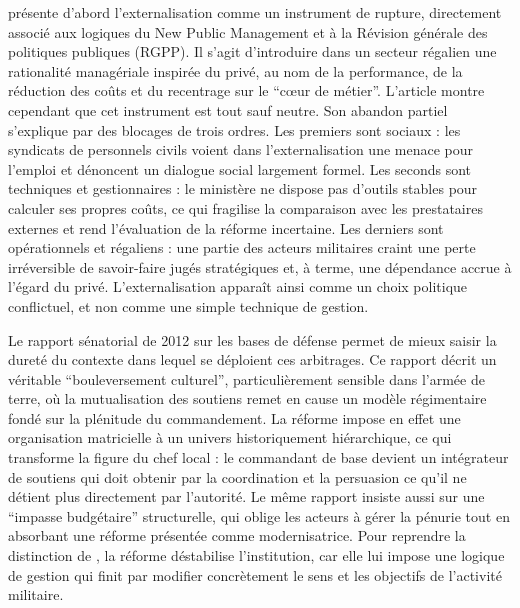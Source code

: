 \documentclass[12pt,a4paper]{article}
\begin{document}
\textcite{Larrieu2018NPMSoutiensArmees} pr\'esente d'abord l'externalisation comme un instrument de rupture, directement associ\'e aux logiques du New Public Management et \`a la R\'evision g\'en\'erale des politiques publiques (RGPP). Il s'agit d'introduire dans un secteur r\'egalien une rationalit\'e manag\'eriale inspir\'ee du priv\'e, au nom de la performance, de la r\'eduction des co\^uts et du recentrage sur le ``c\oe ur de m\'etier''. L'article montre cependant que cet instrument est tout sauf neutre. Son abandon partiel s'explique par des blocages de trois ordres. Les premiers sont sociaux : les syndicats de personnels civils voient dans l'externalisation une menace pour l'emploi et d\'enoncent un dialogue social largement formel. Les seconds sont techniques et gestionnaires : le minist\`ere ne dispose pas d'outils stables pour calculer ses propres co\^uts, ce qui fragilise la comparaison avec les prestataires externes et rend l'\'evaluation de la r\'eforme incertaine. Les derniers sont op\'erationnels et r\'egaliens : une partie des acteurs militaires craint une perte irr\'eversible de savoir-faire jug\'es strat\'egiques et, \`a terme, une d\'ependance accrue \`a l'\'egard du priv\'e. L'externalisation appara\^it ainsi comme un choix politique conflictuel, et non comme une simple technique de gestion.

Le rapport s\'enatorial de 2012 sur les bases de d\'efense \parencite{RogerDulait2012BasesDefense} permet de mieux saisir la duret\'e du contexte dans lequel se d\'eploient ces arbitrages. Ce rapport d\'ecrit un v\'eritable ``bouleversement culturel'', particuli\`erement sensible dans l'arm\'ee de terre, o\`u la mutualisation des soutiens remet en cause un mod\`ele r\'egimentaire fond\'e sur la pl\'enitude du commandement. La r\'eforme impose en effet une organisation matricielle \`a un univers historiquement hi\'erarchique, ce qui transforme la figure du chef local : le commandant de base devient un int\'egrateur de soutiens qui doit obtenir par la coordination et la persuasion ce qu'il ne d\'etient plus directement par l'autorit\'e. Le m\^eme rapport insiste aussi sur une ``impasse budg\'etaire'' structurelle, qui oblige les acteurs \`a g\'erer la p\'enurie tout en absorbant une r\'eforme pr\'esent\'ee comme modernisatrice. Pour reprendre la distinction de \textcite{Jakubowski2011InstitutionMilitaire}, la r\'eforme d\'estabilise l'institution, car elle lui impose une logique de gestion qui finit par modifier concr\`etement le sens et les objectifs de l'activit\'e militaire.
\end{document}
